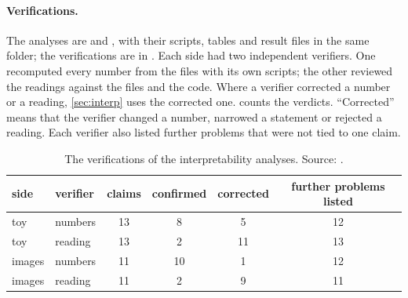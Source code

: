 \paragraph{Verifications.} The analyses are  and , with their scripts, tables and result files in the same folder; the verifications are in . Each side had two independent verifiers. One recomputed every number from the files with its own scripts; the other reviewed the readings against the files and the code. Where a verifier corrected a number or a reading, \cref{sec:interp} uses the corrected one.  counts the verdicts. ``Corrected'' means that the verifier changed a number, narrowed a statement or rejected a reading. Each verifier also listed further problems that were not tied to one claim.

\begin{table}[ht]
\centering\footnotesize\setlength{\tabcolsep}{5pt}
\begin{tabular}{llcccc}
\toprule
side & verifier & claims & confirmed & corrected & further problems listed\\
\midrule
toy & numbers & 13 & 8 & 5 & 12\\
toy & reading & 13 & 2 & 11 & 13\\
images & numbers & 11 & 10 & 1 & 12\\
images & reading & 11 & 2 & 9 & 11\\
\bottomrule
\end{tabular}
\caption{The verifications of the interpretability analyses. Source: .}
\label{tab:verif}
\end{table}

